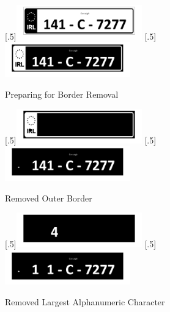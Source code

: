 \documentclass[a4paper]{article}
\begin{document}
	\begin{figure}[H]
		\centering
		[.5\linewidth]{\includegraphics[height=1.5cm]{Results/Q2/NumPlate4/qanumber_plate_4Mid.jpg}}%
		[.5\linewidth]{\includegraphics[height=1.5cm]{Results/Q2/NumPlate4/qanumber_plate_4Not.jpg}}%
		\caption{Preparing for Border Removal}
		\label{fig:}
	\end{figure}
	\begin{figure}[H]
		\centering
		[.5\linewidth]{\includegraphics[height=1.5cm]{Results/Q2/NumPlate4/qanumber_plate_4Border.jpg}}%
		[.5\linewidth]{\includegraphics[height=1.5cm]{Results/Q2/NumPlate4/qanumber_plate_4NoBorder.jpg}}%
		\caption{Removed Outer Border}
		\label{fig:}
	\end{figure}
	\begin{figure}[H]
		\centering
		[.5\linewidth]{\includegraphics[height=1.5cm]{Results/Q2/NumPlate4/qanumber_plate_4BigChar.jpg}}%
		[.5\linewidth]{\includegraphics[height=1.5cm]{Results/Q2/NumPlate4/qanumber_plate_4Remain.jpg}}%
		\caption{Removed Largest Alphanumeric Character}
		\label{fig:}
	\end{figure}
\end{document}
